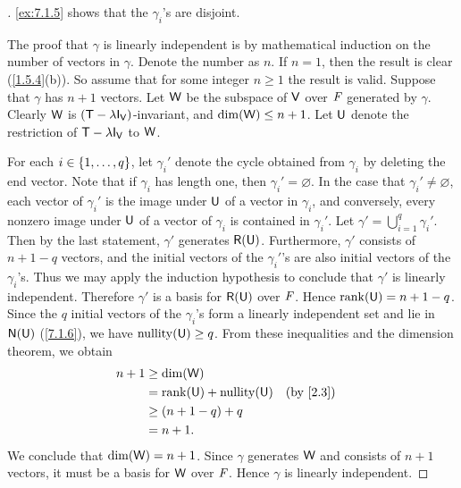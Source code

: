 \begin{proof}[]
  \cref{ex:7.1.5} shows that the \(\gamma_i\)'s are disjoint.

  The proof that \(\gamma\) is linearly independent is by mathematical induction on the number of vectors in \(\gamma\).
  Denote the number as \(n\).
  If \(n = 1\), then the result is clear (\cref{1.5.4}(b)).
  So assume that for some integer \(n \geq 1\) the result is valid.
  Suppose that \(\gamma\) has \(n + 1\) vectors.
  Let \(\mathsf{W}\) be the subspace of \(\mathsf{V}\) over \(\mathit{F}\) generated by \(\gamma\).
  Clearly \(\mathsf{W}\) is \((\T - \lambda \IT[\V])\)-invariant, and \(\dim(\mathsf{W}) \leq n + 1\).
  Let \(\mathsf{U}\) denote the restriction of \(\T - \lambda \IT[\V]\) to \(\mathsf{W}\).

  For each \(i \in \left\lbrace1, \dots, q\right\rbrace\), let \(\gamma_i'\) denote the cycle obtained from \(\gamma_i\) by deleting the end vector.
  Note that if \(\gamma_i\) has length one, then \(\gamma_i' = \varnothing\).
  In the case that \(\gamma_i' \neq \varnothing\), each vector of \(\gamma_i'\) is the image under \(\mathsf{U}\) of a vector in \(\gamma_i\), and conversely, every nonzero image under \(\mathsf{U}\) of a vector of \(\gamma_i\) is contained in \(\gamma_i'\).
  Let \(\gamma' = \bigcup_{i = 1}^q \gamma_i'\).
  Then by the last statement, \(\gamma'\) generates \(\rg{\U}\).
  Furthermore, \(\gamma'\) consists of \(n + 1 - q\) vectors, and the initial vectors of the \(\gamma_i'\)'s are also initial vectors of the \(\gamma_i\)'s.
  Thus we may apply the induction hypothesis to conclude that \(\gamma'\) is linearly independent.
  Therefore \(\gamma'\) is a basis for \(\rg{\U}\) over \(\mathit{F}\).
  Hence \(\rk{\U} = n + 1 - q\).
  Since the \(q\) initial vectors of the \(\gamma_i\)'s form a linearly independent set and lie in \(\ns{\U}\) (\cref{7.1.6}), we have \(\nt{\U} \geq q\).
  From these inequalities and the dimension theorem, we obtain
  \begin{align*}
    n + 1 & \geq \dim(\W)                      \\
          & = \rk{\U} + \nt{\U}  &  & \by{2.3} \\
          & \geq (n + 1 - q) + q               \\
          & = n + 1.
  \end{align*}
  We conclude that \(\dim(\mathsf{W}) = n + 1\).
  Since \(\gamma\) generates \(\mathsf{W}\) and consists of \(n + 1\) vectors, it must be a basis for \(\mathsf{W}\) over \(\mathit{F}\).
  Hence \(\gamma\) is linearly independent.
\end{proof}

